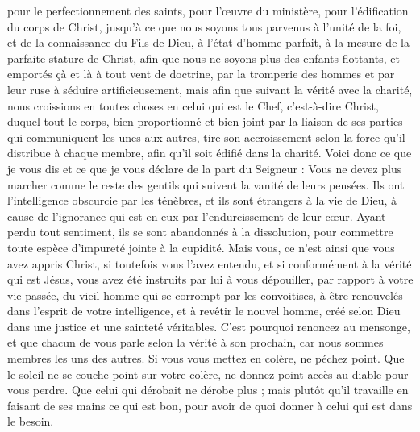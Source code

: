 \begin{multicols}{2}
pour le perfectionnement des saints, pour l’œuvre du ministère, pour l'édification du corps de Christ,
jusqu'à ce que nous soyons tous parvenus à l'unité de la foi, et de la connaissance du Fils de Dieu, à l'état d'homme parfait, à la mesure de la parfaite stature de Christ,
afin que nous ne soyons plus des enfants flottants, et emportés çà et là à tout vent de doctrine, par la tromperie des hommes et par leur ruse à séduire artificieusement,
mais afin que suivant la vérité avec la charité, nous croissions en toutes choses en celui qui est le Chef, c'est-à-dire Christ,
duquel tout le corps, bien proportionné et bien joint par la liaison de ses parties qui communiquent les unes aux autres, tire son accroissement selon la force qu’il distribue à chaque membre, afin qu’il soit édifié dans la charité.
Voici donc ce que je vous dis et ce que je vous déclare de la part du Seigneur : Vous ne devez plus marcher comme le reste des gentils qui suivent la vanité de leurs pensées.
Ils ont l’intelligence obscurcie par les ténèbres, et ils sont étrangers à la vie de Dieu, à cause de l'ignorance qui est en eux par l'endurcissement de leur cœur.
Ayant perdu tout sentiment, ils se sont abandonnés à la dissolution, pour commettre toute espèce d’impureté jointe à la cupidité.
Mais vous, ce n’est ainsi que vous avez appris Christ,
si toutefois vous l'avez entendu, et si conformément à la vérité qui est Jésus, vous avez été instruits par lui à vous dépouiller,
par rapport à votre vie passée, du vieil homme qui se corrompt par les convoitises,
à être renouvelés dans l'esprit de votre intelligence,
et à revêtir le nouvel homme, créé selon Dieu dans une justice et une sainteté véritables.
C'est pourquoi renoncez au mensonge, et que chacun de vous parle selon la vérité à son prochain, car nous sommes membres les uns des autres.
Si vous vous mettez en colère, ne péchez point. Que le soleil ne se couche point sur votre colère,
ne donnez point accès au diable pour vous perdre.
Que celui qui dérobait ne dérobe plus ; mais plutôt qu’il travaille en faisant de ses mains ce qui est bon, pour avoir de quoi donner à celui qui est dans le besoin.

\end{multicols}
